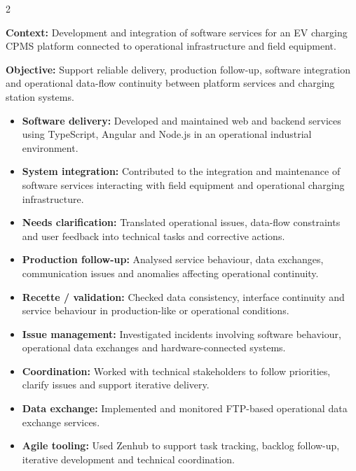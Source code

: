 \documentclass[8pt,a4paper,ragged2e,withhyper]{altacv}
\begin{document}



\makecvheader
\vspace{-0.3cm}


\begin{paracol}{2}



\textbf{Context:} Development and integration of software services for an EV charging CPMS platform connected to operational infrastructure and field equipment.

\textbf{Objective:} Support reliable delivery, production follow-up, software integration and operational data-flow continuity between platform services and charging station systems.

\begin{itemize}
  \item \textbf{Software delivery:} Developed and maintained web and backend services using TypeScript, Angular and Node.js in an operational industrial environment.
  \item \textbf{System integration:} Contributed to the integration and maintenance of software services interacting with field equipment and operational charging infrastructure.
  \item \textbf{Needs clarification:} Translated operational issues, data-flow constraints and user feedback into technical tasks and corrective actions.
  \item \textbf{Production follow-up:} Analysed service behaviour, data exchanges, communication issues and anomalies affecting operational continuity.
  \item \textbf{Recette / validation:} Checked data consistency, interface continuity and service behaviour in production-like or operational conditions.
  \item \textbf{Issue management:} Investigated incidents involving software behaviour, operational data exchanges and hardware-connected systems.
  \item \textbf{Coordination:} Worked with technical stakeholders to follow priorities, clarify issues and support iterative delivery.
  \item \textbf{Data exchange:} Implemented and monitored FTP-based operational data exchange services.
  \item \textbf{Agile tooling:} Used Zenhub to support task tracking, backlog follow-up, iterative development and technical coordination.
\end{itemize}


\end{paracol}
\end{document}
